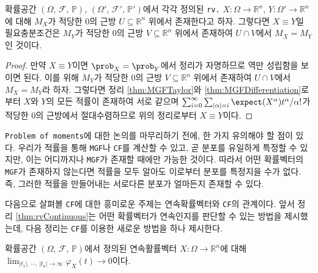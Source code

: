 \begin{corollary}
    확률공간 $(\Omega,\,\mathcal{F},\,\mathbb{P}),\,(\Omega',\,\mathcal{F}',\,\mathbb{P}')$에서 각각 정의된 \texttt{rv.} $X:\Omega\to\mathbb{R}^n,\,Y:\Omega'\to\mathbb{R}^n$에 대해 $M_X$가 적당한 $0$의 근방 $U\subseteq\mathbb{R}^n$ 위에서 존재한다고 하자. 그렇다면 $X\equiv Y$일 필요충분조건은 $M_Y$가 적당한 $0$의 근방 $V\subseteq\mathbb{R}^n$ 위에서 존재하여 $U\cap V$에서 $M_X=M_Y$인 것이다.
\end{corollary}

\begin{proof}
    만약 $X\equiv Y$이면 $\prob_X=\prob_Y$에서 정리가 자명하므로 역만 성립함을 보이면 된다. 이를 위해 $M_Y$가 적당한 $0$의 근방 $V\subseteq\mathbb{R}^n$ 위에서 존재하여 $U\cap V$에서 $M_X=M_Y$라 하자. 그렇다면 정리 \ref{thm:MGFTaylor}와 \ref{thm:MGFDifferentiation}로부터 $X$와 $Y$의 모든 적률이 존재하여 서로 같으며 $\sum_{i=0}^\infty\sum_{|\alpha|=i}\expect(X^\alpha)t^\alpha/\alpha!$가 적당한 $0$의 근방에서 절대수렴하므로 위의 정리로부터 $X\equiv Y$이다.
\end{proof}

\texttt{Problem of moments}에 대한 논의를 마무리하기 전에, 한 가지 유의해야 할 점이 있다. 우리가 적률을 통해 \texttt{MGF}나 \texttt{CF}를 계산할 수 있고, 곧 분포를 유일하게 특정할 수 있지만, 이는 어디까지나 \texttt{MGF}가 존재할 때에만 가능한 것이다. 따라서 어떤 확률벡터의 \texttt{MGF}가 존재하지 않는다면 적률을 모두 알아도 이로부터 분포를 특정지을 수가 없다. 즉, 그러한 적률을 만들어내는 서로다른 분포가 얼마든지 존재할 수 있다.

다음으로 살펴볼 \texttt{CF}에 대한 흥미로운 주제는 연속확률벡터와 \texttt{CF}의 관계이다. 앞서 정리 \ref{thm:rvContinuous}는 어떤 확률벡터가 연속인지를 판단할 수 있는 방법을 제시했는데, 다음 정리는 \texttt{CF}를 이용한 새로운 방법을 하나 제시한다.

\begin{theorem}
    확률공간 $(\Omega,\,\mathcal{F},\,\mathbb{P})$에서 정의된 연속활률벡터 $X:\Omega\to\mathbb{R}^n$에 대해 $\lim_{|t_1|,\,\cdots,\,|t_n|\to\infty}\varphi_X(t)\to0$이다.
\end{theorem}

